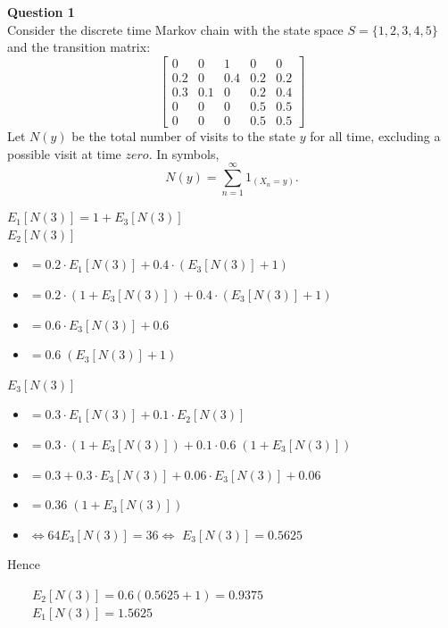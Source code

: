 \documentclass[12pt]{article}
\begin{document}


\noindent
\textbf{Question 1}\\
Consider the discrete time Markov chain with the state space $S = \{1, 2, 3, 4, 5\}$ and the
transition matrix:
$$
\begin{bmatrix}
    0&0&1&0&0\\
    0.2&0&0.4&0.2&0.2\\
    0.3&0.1&0&0.2&0.4\\
    0 &0&0&0.5&0.5\\
    0&0&0&0.5&0.5
\end{bmatrix}
$$
Let $N(y)$ be the total number of visits to the state $y$ for all time, excluding a possible visit
at time $zero$. In symbols,
$$
N(y) = \sum_{n=1}^\infty 1_{(X_n=y)}.$$


$E_1[N(3)] = 1 + E_3[N(3)]$\\

$E_2[N(3)]$ 
\begin{itemize}
    \item $= 0.2\cdot E_1[N(3)] + 0.4\cdot (E_3[N(3)]+1)$
    \item $= 0.2\cdot (1 + E_3[N(3)]) + 0.4\cdot (E_3[N(3)]+1)$
    \item $= 0.6\cdot E_3[N(3)] + 0.6 $
    \item $= 0.6\;(E_3[N(3)] +1)$
\end{itemize} 

$E_3[N(3)]$ 
\begin{itemize}
    \item $= 0.3\cdot E_1[N(3)] + 0.1\cdot E_2[N(3)]$
    \item $= 0.3\cdot (1 + E_3[N(3)]) + 0.1\cdot 0.6\;(1+E_3[N(3)]) $
    \item $= 0.3 + 0.3\cdot E_3[N(3)] + 0.06\cdot E_3[N(3)] + 0.06 $
    \item $= 0.36\;(1 + E_3[N(3)])$
    \item $\Leftrightarrow 64E_3[N(3)] = 36 \Leftrightarrow$ \textbf{$E_3[N(3)] = 0.5625$}
\end{itemize}
Hence

$\qquad E_2[N(3)] = 0.6(0.5625 + 1) = 0.9375$\\

$\qquad E_1[N(3)] = 1.5625$\\
\end{document}

